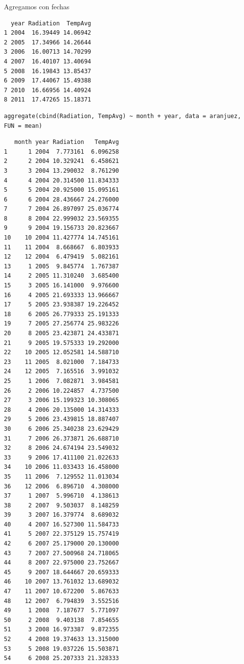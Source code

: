 \documentclass[xcolor={usenames,svgnames,dvipsnames}]{beamer}
\begin{document}
\begin{frame}[fragile,label=sec-5-3-4]{Agregamos con fechas}
\begin{verbatim}
  year Radiation  TempAvg
1 2004  16.39449 14.06942
2 2005  17.34966 14.26644
3 2006  16.00713 14.70299
4 2007  16.40107 13.40694
5 2008  16.19843 13.85437
6 2009  17.44067 15.49388
7 2010  16.66956 14.40924
8 2011  17.47265 15.18371
\end{verbatim}

\lstset{language=R,label= ,caption= ,numbers=none}
\begin{lstlisting}
aggregate(cbind(Radiation, TempAvg) ~ month + year, data = aranjuez, FUN = mean)
\end{lstlisting}

\begin{verbatim}
   month year Radiation   TempAvg
1      1 2004  7.773161  6.096258
2      2 2004 10.329241  6.458621
3      3 2004 13.290032  8.761290
4      4 2004 20.314500 11.834333
5      5 2004 20.925000 15.095161
6      6 2004 28.436667 24.276000
7      7 2004 26.897097 25.036774
8      8 2004 22.999032 23.569355
9      9 2004 19.156733 20.823667
10    10 2004 11.427774 14.745161
11    11 2004  8.668667  6.803933
12    12 2004  6.479419  5.082161
13     1 2005  9.845774  1.767387
14     2 2005 11.310240  3.685400
15     3 2005 16.141000  9.976600
16     4 2005 21.693333 13.966667
17     5 2005 23.938387 19.226452
18     6 2005 26.779333 25.191333
19     7 2005 27.256774 25.983226
20     8 2005 23.423871 24.433871
21     9 2005 19.575333 19.292000
22    10 2005 12.052581 14.588710
23    11 2005  8.021000  7.184733
24    12 2005  7.165516  3.991032
25     1 2006  7.082871  3.984581
26     2 2006 10.224857  4.737500
27     3 2006 15.199323 10.308065
28     4 2006 20.135000 14.314333
29     5 2006 23.439815 18.887407
30     6 2006 25.340238 23.629429
31     7 2006 26.373871 26.688710
32     8 2006 24.674194 23.549032
33     9 2006 17.411100 21.022633
34    10 2006 11.033433 16.458000
35    11 2006  7.129552 11.013034
36    12 2006  6.896710  4.308000
37     1 2007  5.996710  4.138613
38     2 2007  9.503037  8.148259
39     3 2007 16.379774  8.689032
40     4 2007 16.527300 11.584733
41     5 2007 22.375129 15.757419
42     6 2007 25.179000 20.130000
43     7 2007 27.500968 24.718065
44     8 2007 22.975000 23.752667
45     9 2007 18.644667 20.659333
46    10 2007 13.761032 13.689032
47    11 2007 10.672200  5.867633
48    12 2007  6.794839  3.552516
49     1 2008  7.187677  5.771097
50     2 2008  9.403138  7.854655
51     3 2008 16.973387  9.872355
52     4 2008 19.374633 13.315000
53     5 2008 19.037226 15.503871
54     6 2008 25.207333 21.328333

\end{verbatim}
\end{frame}
\end{document}
